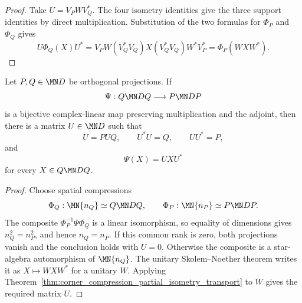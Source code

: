 \begin{proof}\leanok
    Take $U=V_PWV_Q^*$. The four isometry identities give the three support
    identities by direct multiplication. Substitution of the two formulas
    for $\Phi_P$ and $\Phi_Q$ gives
    \[
        U\Phi_Q(X)U^*
        =V_PW(V_Q^*V_Q)X(V_Q^*V_Q)W^*V_P^*
        =\Phi_P(WXW^*).
    \]
\end{proof}

\begin{theorem}%
    \label{thm:corner_star_isomorphism_partial_isometry}
    \leanok
    Let $P,Q\in\MN D$ be orthogonal projections. If
    \[
        \Psi:Q\MN DQ\longrightarrow P\MN DP
    \]
    is a bijective complex-linear map preserving multiplication and the
    adjoint, then there is a matrix $U\in\MN D$ such that
    \[
        U=PUQ,\qquad U^*U=Q,\qquad UU^*=P,
    \]
    and
    \[
        \Psi(X)=UXU^*
    \]
    for every $X\in Q\MN DQ$.
\end{theorem}

\begin{proof}\leanok
    Choose spatial compressions
    \[
        \Phi_Q:\MN{n_Q}\simeq Q\MN DQ,\qquad
        \Phi_P:\MN{n_P}\simeq P\MN DP.
    \]
    The composite $\Phi_P^{-1}\Psi\Phi_Q$ is a linear isomorphism, so equality
    of dimensions gives $n_Q^2=n_P^2$, and hence $n_Q=n_P$. If this common
    rank is zero, both projections vanish and the conclusion holds with
    $U=0$. Otherwise the composite is a star-algebra automorphism of
    $\MN{n_Q}$. The unitary Skolem--Noether theorem writes it as
    $X\mapsto WXW^*$ for a unitary $W$. Applying
    Theorem~\ref{thm:corner_compression_partial_isometry_transport} to $W$
    gives the required matrix $U$.
\end{proof}
